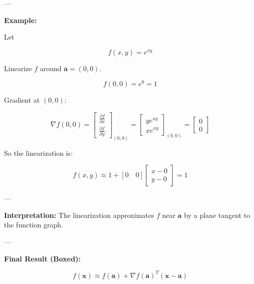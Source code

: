 ---

\textbf{Example:}

Let

\[
f(x, y) = e^{x y}
\]

Linearize \( f \) around \( \mathbf{a} = (0, 0) \).

\[
f(0, 0) = e^0 = 1
\]

Gradient at \( (0,0) \):

\[
\nabla f(0,0) =
\begin{bmatrix}
\frac{\partial f}{\partial x} \\
\frac{\partial f}{\partial y}
\end{bmatrix}_{(0,0)} =
\begin{bmatrix}
y e^{x y} \\
x e^{x y}
\end{bmatrix}_{(0,0)} =
\begin{bmatrix}
0 \\
0
\end{bmatrix}
\]

So the linearization is:

\[
f(x,y) \approx 1 + [0 \quad 0] \begin{bmatrix} x - 0 \\ y - 0 \end{bmatrix} = 1
\]

---

\textbf{Interpretation:} The linearization approximates \( f \) near \( \mathbf{a} \) by a plane tangent to the function graph.

---

\textbf{Final Result (Boxed):}

\[
\boxed{
f(\mathbf{x}) \approx f(\mathbf{a}) + \nabla f(\mathbf{a})^T (\mathbf{x} - \mathbf{a})
}
\]



